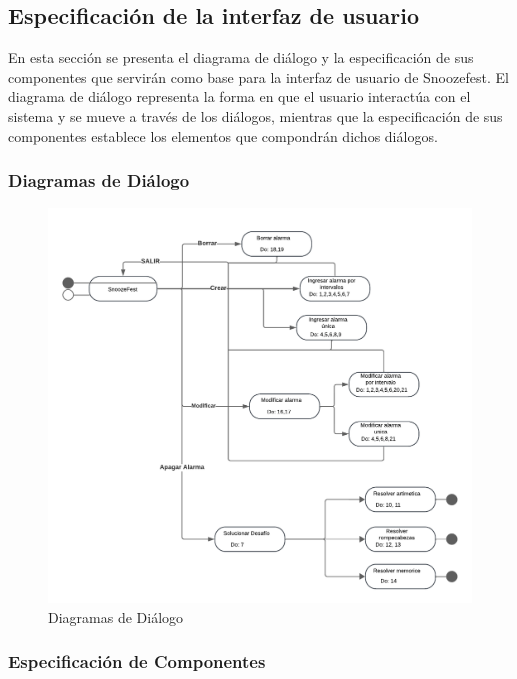 \subsection{Especificación de la interfaz de usuario}
En esta sección se presenta el diagrama de diálogo y la especificación de sus componentes que servirán como base para la interfaz de usuario de Snoozefest. El diagrama de diálogo representa la forma en que el usuario interactúa con el sistema y se mueve a través de los diálogos, mientras que la especificación de sus componentes establece los elementos que compondrán dichos diálogos.

\subsubsection{Diagramas de Diálogo}
\begin{figure}[H]
	\centering
	\includegraphics[page=1,width=\textwidth]{./img/dialogos.pdf}
	\caption{Diagramas de Diálogo}
        \vspace{10pt}
	\label{fig:Diagrama de Diálogos}
\end{figure}

\subsubsection{Especificación de Componentes}

